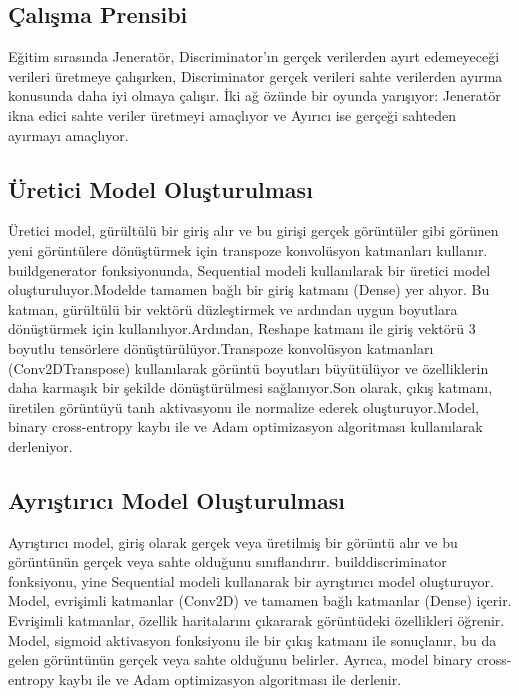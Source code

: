 \documentclass[10pt]{article}
\begin{document}
	\subsection{Çalışma  Prensibi} 
	Eğitim sırasında Jeneratör, Discriminator'ın gerçek verilerden ayırt edemeyeceği verileri üretmeye çalışırken, Discriminator gerçek verileri sahte verilerden ayırma konusunda daha iyi olmaya çalışır. İki ağ özünde bir oyunda yarışıyor: Jeneratör ikna edici sahte veriler üretmeyi amaçlıyor ve Ayırıcı ise gerçeği sahteden ayırmayı amaçlıyor.
	
	
	
	
	\subsection{Üretici Model Oluşturulması } 
	Üretici model, gürültülü bir giriş alır ve bu girişi gerçek görüntüler gibi görünen yeni görüntülere dönüştürmek için transpoze konvolüsyon katmanları kullanır.
	buildgenerator fonksiyonunda, Sequential modeli kullanılarak bir üretici model oluşturuluyor.Modelde tamamen bağlı bir giriş katmanı (Dense) yer alıyor. Bu katman, gürültülü bir vektörü düzleştirmek ve ardından uygun boyutlara dönüştürmek için kullanılıyor.Ardından, Reshape katmanı ile giriş vektörü 3 boyutlu tensörlere dönüştürülüyor.Transpoze konvolüsyon katmanları (Conv2DTranspose) kullanılarak görüntü boyutları büyütülüyor ve özelliklerin daha karmaşık bir şekilde dönüştürülmesi sağlanıyor.Son olarak, çıkış katmanı, üretilen görüntüyü tanh aktivasyonu ile normalize ederek oluşturuyor.Model, binary cross-entropy kaybı ile ve Adam optimizasyon algoritması kullanılarak derleniyor.\cite{kaggle}
	
	
	\subsection{Ayrıştırıcı Model Oluşturulması}
	
	Ayrıştırıcı model, giriş olarak gerçek veya üretilmiş bir görüntü alır ve bu görüntünün gerçek veya sahte olduğunu sınıflandırır.	builddiscriminator fonksiyonu, yine Sequential modeli kullanarak bir ayrıştırıcı model oluşturuyor.
	Model, evrişimli katmanlar (Conv2D) ve tamamen bağlı katmanlar (Dense) içerir.
	Evrişimli katmanlar, özellik haritalarını çıkararak görüntüdeki özellikleri öğrenir.	Model, sigmoid aktivasyon fonksiyonu ile bir çıkış katmanı ile sonuçlanır, bu da gelen görüntünün gerçek veya sahte olduğunu belirler.
	Ayrıca, model binary cross-entropy kaybı ile ve Adam optimizasyon algoritması ile derlenir.\cite{kaggle}
	
\end{document}
